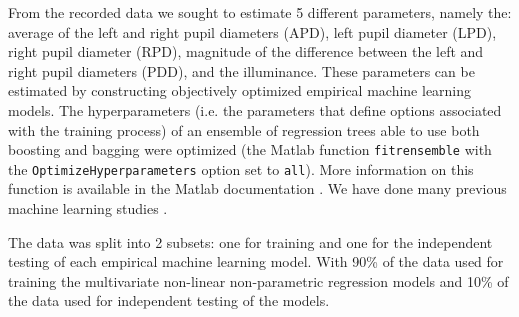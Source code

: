 \documentclass[10pt]{article}
\begin{document}
 From the recorded data we sought to estimate 5 different parameters, namely the: average of the left and right pupil diameters (APD), left pupil diameter (LPD), right pupil diameter (RPD), magnitude of the difference between the left and right pupil diameters (PDD), and the illuminance. These parameters can be estimated by constructing objectively optimized empirical machine learning models. The hyperparameters (i.e. the parameters that define options associated with the training process) of an ensemble of regression trees able to use both boosting and bagging were optimized (the Matlab function  \texttt{fitrensemble} with the \texttt{OptimizeHyperparameters} option set to \texttt{all}). More information on this function is available in the Matlab documentation \cite{Matlab}. We have done many previous machine learning studies \cite{lary2016machine, brown2008neural, lary2009machine, lary2008space, lary2004using, malakar2013towards, lary2010artificial, malakar2012estimation, lary2013using, lary2007using, albayrak2011modis, brown2006using, lary2003using, malakar2012towards, lary2014bigdata, lary2015using, kneen2016interpretation, lary2010machine, medvedev2016analysis, lary2016using, o2017demonstration, wu2017insights, nathan2019combining, lary2019using, lary2018machine, wu2019using, alavi2016progress, ahmad2016devices, zewdie2018applying, malakar2018case, zewdie2019applying, zewdie2019estimating, chang2019time}.

The data was split into 2 subsets: one for training and one for the independent testing of each empirical machine learning model. With 90\% of the data used for training the multivariate non-linear non-parametric regression models and 10\% of the data used for independent testing of the models. 

\end{document}
